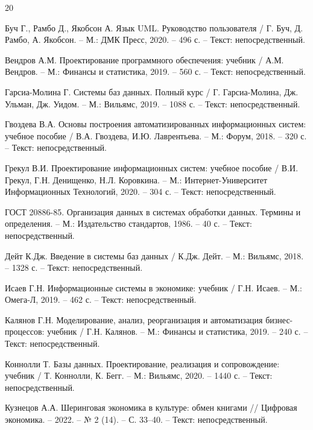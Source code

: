 \documentclass[14pt,a4paper]{extarticle}
\begin{document}
\begin{thebibliography}{20}
\setlength{\itemsep}{0pt}
\setlength{\parskip}{0pt}
\setlength{\parsep}{0pt}

  Буч Г., Рамбо Д., Якобсон А. Язык UML. Руководство пользователя / Г.
  Буч, Д. Рамбо, А. Якобсон. -- М.: ДМК Пресс, 2020. -- 496 с. -- Текст:
  непосредственный.

  Вендров А.М. Проектирование программного обеспечения: учебник / А.М.
  Вендров. -- М.: Финансы и статистика, 2019. -- 560 с. -- Текст:
  непосредственный.

  Гарсиа-Молина Г. Системы баз данных. Полный курс / Г. Гарсиа-Молина,
  Дж. Ульман, Дж. Уидом. -- М.: Вильямс, 2019. -- 1088 с. -- Текст:
  непосредственный.

  Гвоздева В.А. Основы построения автоматизированных информационных
  систем: учебное пособие / В.А. Гвоздева, И.Ю. Лаврентьева. -- М.:
  Форум, 2018. -- 320 с. -- Текст: непосредственный.

  Грекул В.И. Проектирование информационных систем: учебное пособие /
  В.И. Грекул, Г.Н. Денищенко, Н.Л. Коровкина. -- М.:
  Интернет-Университет Информационных Технологий, 2020. -- 304 с. --
  Текст: непосредственный.

  ГОСТ 20886-85. Организация данных в системах обработки данных. Термины
  и определения. -- М.: Издательство стандартов, 1986. -- 40 с. --
  Текст: непосредственный.

  Дейт К.Дж. Введение в системы баз данных / К.Дж. Дейт. -- М.: Вильямс,
  2018. -- 1328 с. -- Текст: непосредственный.

  Исаев Г.Н. Информационные системы в экономике: учебник / Г.Н. Исаев.
  -- М.: Омега-Л, 2019. -- 462 с. -- Текст: непосредственный.

  Калянов Г.Н. Моделирование, анализ, реорганизация и автоматизация
  бизнес-процессов: учебник / Г.Н. Калянов. -- М.: Финансы и статистика,
  2019. -- 240 с. -- Текст: непосредственный.

  Коннолли Т. Базы данных. Проектирование, реализация и сопровождение:
  учебник / Т. Коннолли, К. Бегг. -- М.: Вильямс, 2020. -- 1440 с. --
  Текст: непосредственный.

  Кузнецов А.А. Шеринговая экономика в культуре: обмен книгами //
  Цифровая экономика. -- 2022. -- № 2 (14). -- С. 33--40. -- Текст:
  непосредственный.


\end{thebibliography}
\end{document}
